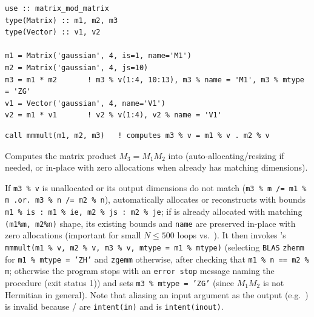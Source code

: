\begin{description}[leftmargin=2.2cm, style=nextline]
\end{description}

\lstset{language=[95]Fortran}
\begin{lstlisting}
use :: matrix_mod_matrix
type(Matrix) :: m1, m2, m3
type(Vector) :: v1, v2

m1 = Matrix('gaussian', 4, is=1, name='M1')
m2 = Matrix('gaussian', 4, js=10)
m3 = m1 * m2       ! m3 % v(1:4, 10:13), m3 % name = 'M1', m3 % mtype = 'ZG'
v1 = Vector('gaussian', 4, name='V1')
v2 = m1 * v1       ! v2 % v(1:4), v2 % name = 'V1'
\end{lstlisting}


\lstset{language=[95]Fortran}
\begin{lstlisting}
call mmmult(m1, m2, m3)   ! computes m3 % v = m1 % v . m2 % v
\end{lstlisting}

Computes the matrix product $M_3 = M_1 M_2$ into  (auto-allocating/resizing  if needed, or in-place with zero allocations when  already has matching dimensions).

If \texttt{m3 \% v} is unallocated or its output dimensions do not match (\texttt{m3 \% m /= m1 \% m .or. m3 \% n /= m2 \% n}),  automatically allocates or reconstructs  with bounds \texttt{m1 \% is : m1 \% ie, m2 \% js : m2 \% je}; if  is already allocated with matching \texttt{(m1\%m, m2\%n)} shape, its existing bounds and \texttt{name} are preserved in-place with zero allocations (important for small $N \le 500$ loops vs.\ ). It then invokes 's \texttt{mmmult(m1 \% v, m2 \% v, m3 \% v, mtype = m1 \% mtype)} (selecting \texttt{BLAS} \texttt{zhemm} for \texttt{m1 \% mtype = 'ZH'} and \texttt{zgemm} otherwise, after checking that \texttt{m1 \% n == m2 \% m}; otherwise the program stops with an \texttt{error stop} message naming the procedure (exit status 1)) and sets \texttt{m3 \% mtype = 'ZG'} (since $M_1 M_2$ is not Hermitian in general). Note that aliasing an input argument as the output (e.g.\ ) is invalid because / are \texttt{intent(in)} and  is \texttt{intent(inout)}.

